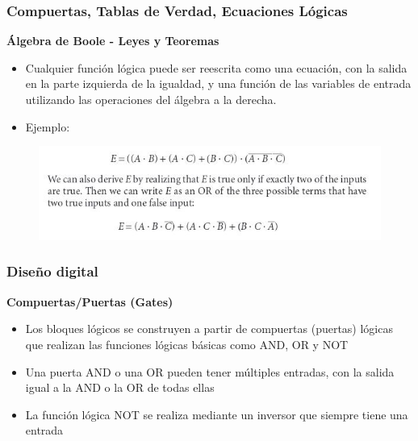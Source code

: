 \documentclass[aspectratio=169,compress]{beamer}
\begin{document}
\begin{footnotesize}
\begin{frame}
\frametitle{Compuertas, Tablas de Verdad, Ecuaciones Lógicas}
\begin{center}\textbf{Álgebra de Boole - Leyes y Teoremas}\end{center}
\begin{itemize}
\item Cualquier función lógica puede ser reescrita como una ecuación, 
con la salida en la parte izquierda de la igualdad, y una función 
de las variables de entrada utilizando las operaciones del álgebra a la derecha.

\item Ejemplo:
\end{itemize}
\begin{figure}
\includegraphics[scale=0.4]{images/ecuacion.jpg} 
\end{figure}
\end{frame}




\begin{frame}[fragile]
\frametitle{Diseño digital}
\begin{center}\textbf{Compuertas/Puertas (Gates)}\end{center}
\begin{itemize}
\item Los bloques lógicos se construyen a partir de 
compuertas (puertas) lógicas
 que realizan las 
funciones lógicas básicas como AND, OR y NOT
\item Una puerta AND o una OR pueden tener 
múltiples entradas, con la salida igual a la AND o 
la OR de todas ellas
\item La función lógica NOT se realiza mediante un 
inversor que siempre tiene una entrada
\end{itemize}

\end{frame}






\end{footnotesize}
\end{document}
